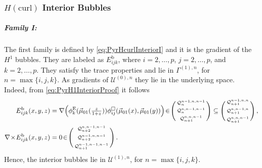 \subsubsection{\texorpdfstring{$H(\mathrm{curl})$}{Hcurl} Interior Bubbles}

\subparagraph{Family I:}
The first family is defined by \eqref{eq:PyrHcurlInteriorI} and it is the gradient of the $H^1$ bubbles.
They are labeled as $E_{ijk}^\mathrm{b}$, where $i=2,\ldots,p$, $j=2,\ldots,p$, and $k=2,\ldots,p$. 
They satisfy the trace properties and lie in $\Gamma^{(1),n}$, for $n=\max\{i,j,k\}$.
As gradients of $\mathcal{U}^{(0),n}$ they lie in the underlying space. 
Indeed, from \eqref{eq:PyrH1InteriorProof} it follows
\begin{equation}
\begin{aligned}
	E_{ijk}^\mathrm{b}(x,y,z)&=\nabla\Big(\phi_k^{\mathrm{E}}(\vec{\mu}_{01}(\textstyle{\frac{z}{1+z}}))\phi_{ij}^\square(\vec{\mu}_{01}(x),\vec{\mu}_{01}(y))\Big)
		\!\in\!\Bigg(\begin{smallmatrix}\mathcal{Q}_n^{n-1,n,n-1}\\[2pt]\mathcal{Q}_n^{n,n-1,n-1}\\[2pt]
			\mathcal{Q}_{n+1}^{n,n,n-1}\end{smallmatrix}\Bigg)
				\subseteq\Bigg(\begin{smallmatrix}\mathcal{Q}_{n+1}^{n-1,n,n}\\[2pt]\mathcal{Q}_{n+1}^{n,n-1,n}\\[2pt]
					\mathcal{Q}_{n+1}^{n,n,n-1}\end{smallmatrix}\Bigg)\,,\\
	\nabla\!\times\! E_{ijk}^\mathrm{b}(x,y,z)&=0
		\!\in\!\Bigg(\begin{smallmatrix}\mathcal{Q}_{n+2}^{n,n-1,n-1}\\[2pt]\mathcal{Q}_{n+2}^{n-1,n,n-1}\\[2pt]
			\mathcal{Q}_{n+1}^{n-1,n-1,n-1}\end{smallmatrix}\Bigg)\,.
\end{aligned}
\end{equation}
Hence, the interior bubbles lie in $\mathcal{U}^{(1),n}$, for $n=\max\{i,j,k\}$.

